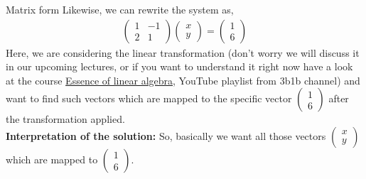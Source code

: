 \documentclass[11pt]{beamer}
\theoremstyle{plain}
\begin{document}
\begin{frame}{Matrix form}
Likewise, we can rewrite the system as,
\begin{align*}
    \begin{pmatrix}
        1 & -1\\
        2 & 1
    \end{pmatrix}\begin{pmatrix}
        x\\y
    \end{pmatrix}=\begin{pmatrix}
        1\\6
    \end{pmatrix}
\end{align*}
Here, we are considering the linear transformation (don't worry we will discuss it in our upcoming lectures, or if you want to understand it right now have a look at the course \href{https://www.youtube.com/watch?v=fNk_zzaMoSs&list=PLZHQObOWTQDPD3MizzM2xVFitgF8hE_ab}{Essence of linear algebra}, YouTube playlist from 3b1b channel) and want to find such vectors which are mapped to the specific vector $\begin{pmatrix}
    1\\6
\end{pmatrix}$ after the transformation applied.\\
\pause
\textbf{Interpretation of the solution:} So, basically we want all those vectors $\begin{pmatrix}
    x\\y
\end{pmatrix}$ which are mapped to $\begin{pmatrix}
    1\\6
\end{pmatrix}$.
\end{frame}
\end{document}
